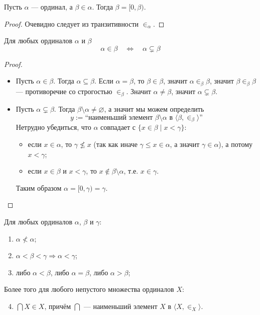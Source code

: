 \documentclass[12pt,a4paper]{article}
\begin{document}
    \begin{statement}
        Пусть $\alpha$ --- ординал, а $\beta \in \alpha$. Тогда $\beta = [0, \beta)$.
    \end{statement}

    \begin{proof}
        Очевидно следует из транзитивности $\in_\alpha$.
    \end{proof}

    \begin{statement}
        Для любых ординалов $\alpha$ и $\beta$
        \[\alpha \in \beta \quad \Longleftrightarrow \quad \alpha \subsetneq \beta\]
    \end{statement}

    \begin{proof}
        \begin{itemize}
            \item Пусть $\alpha \in \beta$. Тогда $\alpha \subseteq \beta$. Если $\alpha = \beta$, то $\beta \in \beta$, значит $\alpha \in_\beta \beta$, значит $\beta \in_\beta \beta$ --- противоречие со строгостью $\in_\beta$. Значит $\alpha \neq \beta$, значит $\alpha \subsetneq \beta$.
            \item Пусть $\alpha \subsetneq \beta$. Тогда $\beta \setminus \alpha \neq \varnothing$, а значит мы можем определить
                \[y := \text{``наименьший элемент $\beta \setminus \alpha$ в $\langle \beta, {\in}_\beta \rangle$''}\]
                Нетрудно убедиться, что $\alpha$ совпадает с $\{x \in \beta \mid x < \gamma\}$:
                \begin{itemize}
                    \item если $x \in \alpha$, то $\gamma \nleqslant x$ (так как иначе $\gamma \leqslant x \in \alpha$, а значит $\gamma \in \alpha$), а потому $x < \gamma$;
                    \item если $x \in \beta$ и $x < \gamma$, то $x \notin \beta \setminus \alpha$, т.е. $x \in \gamma$.
                \end{itemize}
                Таким образом $\alpha = [0, \gamma) = \gamma$.
        \end{itemize}
    \end{proof}

    \begin{theorem}
        Для любых ординалов $\alpha$, $\beta$ и $\gamma$:
        \begin{enumerate}
            \item $\alpha \nless \alpha$;
            \item $\alpha < \beta < \gamma \Rightarrow \alpha < \gamma$;
            \item либо $\alpha < \beta$, либо $\alpha = \beta$, либо $\alpha > \beta$;
        \end{enumerate}
        Более того для любого непустого множества ординалов $X$:
        \begin{enumerate}
            \setcounter{enumi}{3}
            \item $\bigcap X \in X$, причём $\bigcap$ --- наименьший элемент $X$ в $\langle X, \in_X \rangle$.
        \end{enumerate}
    \end{theorem}
\end{document}
